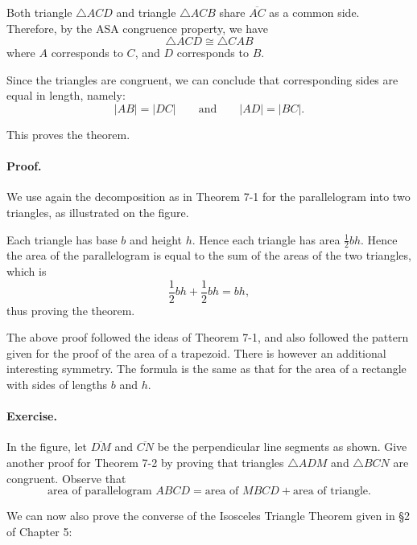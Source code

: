 \documentclass[12pt]{book} %
\begin{document}
Both triangle $\triangle ACD$ and triangle $\triangle ACB$ share $\overline{AC}$ as a common side. Therefore, by the ASA congruence property, we have
\[
\triangle ACD\cong\triangle CAB
\]
where $A$ corresponds to $C$, and $D$ corresponds to $B$.

Since the triangles are congruent, we can conclude that corresponding sides are equal in length, namely:
\[
|AB|=|DC|
\qquad \text{and} \qquad
|AD|=|BC|.
\]

This proves the theorem.


\paragraph{Proof.}
We use again the decomposition as in Theorem 7-1 for the parallelogram into two triangles, as illustrated on the figure.


Each triangle has base $b$ and height $h$. Hence each triangle has area $\frac12 bh$.
Hence the area of the parallelogram is equal to the sum of the areas of the two triangles, which is
\[
\frac12 bh+\frac12 bh=bh,
\]
thus proving the theorem.

The above proof followed the ideas of Theorem 7-1, and also followed the pattern given for the proof of the area of a trapezoid. There is however an additional interesting symmetry. The formula is the same as that for the area of a rectangle with sides of lengths $b$ and $h$.


\paragraph{Exercise.}
In the figure, let $\overline{DM}$ and $\overline{CN}$ be the perpendicular line segments as shown. Give another proof for Theorem 7-2 by proving that triangles $\triangle ADM$ and $\triangle BCN$ are congruent. Observe that
\[
\text{area of parallelogram }ABCD=\text{area of }MBCD+\text{area of triangle.}
\]

We can now also prove the converse of the Isosceles Triangle Theorem given in \S2 of Chapter 5:

\end{document}
